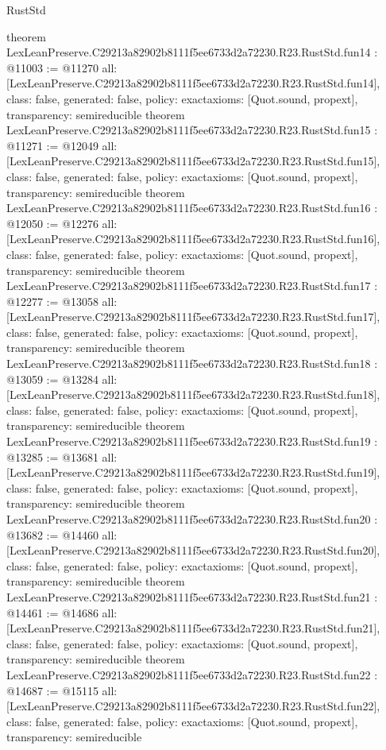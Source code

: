 \begin{lexlean}{RustStd}
\begin{coremodule}
{}
theorem LexLeanPreserve.C29213a82902b8111f5ee6733d2a72230.R23.RustStd.fun14 : @11003 := @11270 {
  all: [LexLeanPreserve.C29213a82902b8111f5ee6733d2a72230.R23.RustStd.fun14],
  class: false,
  generated: false,
  policy: exact{axioms: [Quot.sound, propext]},
  transparency: semireducible
}
theorem LexLeanPreserve.C29213a82902b8111f5ee6733d2a72230.R23.RustStd.fun15 : @11271 := @12049 {
  all: [LexLeanPreserve.C29213a82902b8111f5ee6733d2a72230.R23.RustStd.fun15],
  class: false,
  generated: false,
  policy: exact{axioms: [Quot.sound, propext]},
  transparency: semireducible
}
theorem LexLeanPreserve.C29213a82902b8111f5ee6733d2a72230.R23.RustStd.fun16 : @12050 := @12276 {
  all: [LexLeanPreserve.C29213a82902b8111f5ee6733d2a72230.R23.RustStd.fun16],
  class: false,
  generated: false,
  policy: exact{axioms: [Quot.sound, propext]},
  transparency: semireducible
}
theorem LexLeanPreserve.C29213a82902b8111f5ee6733d2a72230.R23.RustStd.fun17 : @12277 := @13058 {
  all: [LexLeanPreserve.C29213a82902b8111f5ee6733d2a72230.R23.RustStd.fun17],
  class: false,
  generated: false,
  policy: exact{axioms: [Quot.sound, propext]},
  transparency: semireducible
}
theorem LexLeanPreserve.C29213a82902b8111f5ee6733d2a72230.R23.RustStd.fun18 : @13059 := @13284 {
  all: [LexLeanPreserve.C29213a82902b8111f5ee6733d2a72230.R23.RustStd.fun18],
  class: false,
  generated: false,
  policy: exact{axioms: [Quot.sound, propext]},
  transparency: semireducible
}
theorem LexLeanPreserve.C29213a82902b8111f5ee6733d2a72230.R23.RustStd.fun19 : @13285 := @13681 {
  all: [LexLeanPreserve.C29213a82902b8111f5ee6733d2a72230.R23.RustStd.fun19],
  class: false,
  generated: false,
  policy: exact{axioms: [Quot.sound, propext]},
  transparency: semireducible
}
theorem LexLeanPreserve.C29213a82902b8111f5ee6733d2a72230.R23.RustStd.fun20 : @13682 := @14460 {
  all: [LexLeanPreserve.C29213a82902b8111f5ee6733d2a72230.R23.RustStd.fun20],
  class: false,
  generated: false,
  policy: exact{axioms: [Quot.sound, propext]},
  transparency: semireducible
}
theorem LexLeanPreserve.C29213a82902b8111f5ee6733d2a72230.R23.RustStd.fun21 : @14461 := @14686 {
  all: [LexLeanPreserve.C29213a82902b8111f5ee6733d2a72230.R23.RustStd.fun21],
  class: false,
  generated: false,
  policy: exact{axioms: [Quot.sound, propext]},
  transparency: semireducible
}
theorem LexLeanPreserve.C29213a82902b8111f5ee6733d2a72230.R23.RustStd.fun22 : @14687 := @15115 {
  all: [LexLeanPreserve.C29213a82902b8111f5ee6733d2a72230.R23.RustStd.fun22],
  class: false,
  generated: false,
  policy: exact{axioms: [Quot.sound, propext]},
  transparency: semireducible
}
\end{coremodule}
\end{lexlean}
